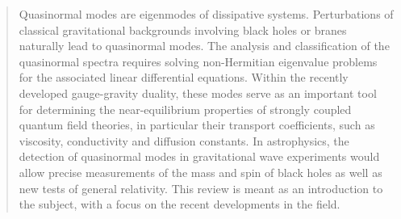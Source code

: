 \documentclass[]{iopart}
\begin{document}
\pagestyle{fancy}
\chead{}
\rhead{\thepage}
\lfoot{}
\cfoot{}
\rfoot{}


\begin{center}
\end{center}

\author{Emanuele Berti$^{1,2}$, Vitor Cardoso$^{1,3}$, Andrei O. Starinets$^{4}$}

\address{$^1$~Department of Physics and Astronomy, The University of
  Mississippi, University, MS 38677-1848, USA}

\address{$^2$ Theoretical Astrophysics 130-33, California Institute of
  Technology, Pasadena, CA 91125, USA}

\address{$^3$~Centro Multidisciplinar de Astrof\'{\i}sica - CENTRA,
  Departamento de F\'{\i}sica, Instituto Superior T\'ecnico, Av. Rovisco Pais
  1, 1049-001 Lisboa, Portugal}

\address{$^4$~Rudolf Peierls Centre for Theoretical Physics, 
Department of Physics, University of Oxford, 1 Keble Road, Oxford, OX1 3NP,
United Kingdom}


\begin{abstract}
Quasinormal modes are eigenmodes of dissipative systems. Perturbations of
classical gravitational backgrounds involving black holes or branes naturally
lead to quasinormal modes. The analysis and classification of the quasinormal
spectra requires solving non-Hermitian eigenvalue problems for the associated
linear differential equations.  Within the recently developed gauge-gravity
duality, these modes serve as an important tool for determining the
near-equilibrium properties of strongly coupled quantum field theories, in
particular their transport coefficients, such as viscosity, conductivity and
diffusion constants.  In astrophysics, the detection of quasinormal modes in
gravitational wave experiments would allow precise measurements of the mass
and spin of black holes as well as new tests of general relativity.  This
review is meant as an introduction to the subject, with a focus on the recent
developments in the field.
\end{abstract}




{\tableofcontents}
\end{document}
